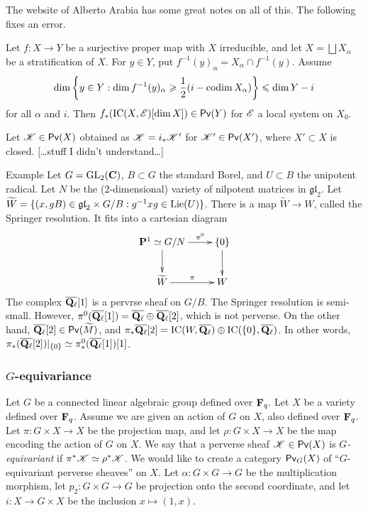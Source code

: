 The website of Alberto Arabia has some great notes on all of this. The 
following fixes an error. 

\begin{prop}
Let $f:X\to Y$ be a surjective proper map with $X$ irreducible, and let 
$X=\bigsqcup X_\alpha$ be a stratification of $X$. For 
$y\in Y$, put $f^{-1}(y)_\alpha = X_\alpha\cap f^{-1}(y)$. Assume 
\[
  \dim\left\{y\in Y:\dim f^{-1}(y)_\alpha \geqslant \frac 1 2 (i-\operatorname{codim} X_\alpha)\right\} \leqslant \dim Y-i 
\]
for all $\alpha$ and $i$. Then 
$f_\ast(\operatorname{IC}(X,\mathscr{E})[\dim X])\in \operatorname{\mathsf{Pv}}(Y)$ for 
$\mathscr{E}$ a local system on $X_0$. 
\end{prop}

Let $\mathscr{K}\in \operatorname{\mathsf{Pv}}(X)$ obtained as $\mathscr{K}=i_\ast \mathscr{K}'$ for 
$\mathscr{K}'\in \operatorname{\mathsf{Pv}}(X')$, where $X'\subset X$ is closed. [\ldots stuff 
I didn't understand\ldots] 

\begin{enonce}[remark]{Example}
Let $G=\operatorname{GL}_2(\mathbf{C})$, $B\subset G$ the standard Borel, and 
$U\subset B$ the unipotent radical. Let $N$ be the ($2$-dimensional) variety of 
nilpotent matrices in $\mathfrak{gl}_2$. Let 
$\widetilde W = \{(x,g B)\in \mathfrak{gl}_2\times G/B:g^{-1} x g\in \operatorname{Lie}(U)\}$. 
There is a map $\widetilde W\to W$, called the Springer resolution. It fits into 
a cartesian diagram 
\[\xymatrix{
  \dP^1\simeq G/N \ar[r]^-{\pi^0} \ar[d] 
    & \{0\} \ar[d] \\
  \widetilde W \ar[r]^\pi 
    & W
}\]
The complex $\overline{\mathbf{Q}_\ell}[1]$ is a pervrse sheaf on $G/B$. The Springer 
resolution is semi-small. However, 
$\pi^0(\overline{\mathbf{Q}_\ell}[1]) = \overline{\mathbf{Q}_\ell}\oplus \overline{\mathbf{Q}_\ell}[2]$, 
which is not perverse. On the other hand, 
$\overline{\mathbf{Q}_\ell}[2]\in \operatorname{\mathsf{Pv}}(\widetilde M)$, and 
$\pi_\ast \overline{\mathbf{Q}_\ell}[2] = \operatorname{IC}(W,\overline{\mathbf{Q}_\ell}) \oplus \operatorname{IC}(\{0\},\overline{\mathbf{Q}_\ell})$. 
In other words, 
$\pi_\ast(\overline{\mathbf{Q}_\ell}[2])|_{\{0\}} \simeq \pi_\ast^0(\overline{\mathbf{Q}_\ell}[1])[1]$. 
\end{enonce}





\subsubsection{\texorpdfstring{$G$}{G}-equivariance}

Let $G$ be a connected linear algebraic group defined over $\mathbf{F}_q$. Let $X$ be a 
variety defined over $\mathbf{F}_q$. Assume we are given an action of $G$ on $X$, also 
defined over $\mathbf{F}_q$. Let $\pi:G\times X\to X$ be the projection map, and let 
$\rho:G\times X\to X$ be the map encoding the action of $G$ on $X$. We say that 
a perverse sheaf $\mathscr{K}\in \operatorname{\mathsf{Pv}}(X)$ is \emph{$G$-equivariant} if 
$\pi^\ast \mathscr{K}\simeq \rho^\ast \mathscr{K}$. We would like to create a category 
$\operatorname{\mathsf{Pv}}_G(X)$ of ``$G$-equivariant perverse sheaves'' on $X$. Let 
$\alpha:G\times G\to G$ be the multiplication morphism, let 
$p_2:G\times G\to G$ be projection onto the second coordinate, and let 
$i:X\to G\times X$ be the inclusion $x\mapsto (1,x)$.  

